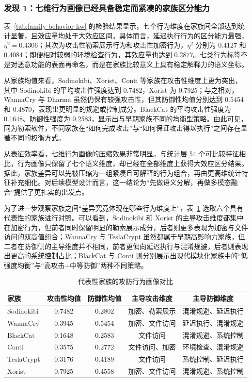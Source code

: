 \subsubsection{发现 1：七维行为画像已经具备稳定而紧凑的家族区分能力}

表~\ref{tab:family-behavior-kw} 的检验结果显示，七个行为维度在家族间全部达到统计显著，且效应量均处于大效应区间。具体而言，延迟执行行为的区分能力最强，$\eta^2=0.4306$；其次为攻击性勒索展示行为和攻击性加密行为，$\eta^2$ 分别为 0.4127 和 0.4084；即便相对较弱的环境检查行为，其效应量也达到 0.2877。七类行为标签不是对恶意功能的表面再命名，而是在家族比较意义上具有稳定解释力的语义坐标。

从家族均值来看，Sodinokibi、Xorist、Conti 等家族在攻击性维度上更为突出，其中 Sodinokibi 的平均攻击性强度达到 0.7482，Xorist 为 0.7925；与之相对，WannaCry 与 Dharma 虽然仍保有较强攻击性，但其防御性均值分别达到 0.5454 和 0.4870，表现出更明显的规避或控制成分。BlackCat 的平均攻击性强度为 0.1648、防御性强度为 0.2583，显示出与早期家族不同的均衡型策略。由此可见，同为勒索软件，不同家族在“如何完成攻击”与“如何保证攻击得以执行”之间存在显著不同的权衡方式。

从表征效率看，七维行为画像的压缩效果非常明显。与统计层 54 个可比较特征相比，行为画像只保留了七个语义维度，却已经在全部维度上获得大效应区分结果。据此，家族差异可以先被压缩为一组紧凑且可解释的行为组合，再由更高维统计特征补充细化。对后续模型设计而言，这一结论为“先做语义分解，再做多模态融合”提供了更扎实的出发点。

为了进一步观察家族之间“差异究竟体现在哪些行为维度上”，表~\ref{tab:representative-family-profiles} 选取六个具有代表性的家族进行对照。可以看到，Sodinokibi 和 Xorist 的主导攻击维度都集中在加密行为，但前者同时保留明显的勒索展示成分，后者则更多表现为加密与文件访问的双高值组合；WannaCry 与 TeslaCrypt 虽然都属于早期高影响力家族，但二者在防御侧的主导维度并不相同，前者更偏向延迟执行与混淆规避，后者则表现出更高的系统控制占比；BlackCat 与 Conti 则分别展示出现代模块化家族中的“低强度均衡”与“高攻击+中等防御”两种不同策略。

\begin{table}[htbp]
\centering
\footnotesize
\setlength{\tabcolsep}{3.5pt}
\caption{代表性家族的攻防行为画像对比}
\label{tab:representative-family-profiles}
\begin{tabular}{lcccc}
\toprule
家族 & 攻击性均值 & 防御性均值 & 主导攻击维度 & 主导防御维度 \\
\midrule
Sodinokibi & 0.7482 & 0.2802 & 加密、勒索展示 & 混淆规避、延迟执行 \\
WannaCry & 0.3945 & 0.5454 & 加密、文件访问 & 延迟执行、混淆规避 \\
BlackCat & 0.1648 & 0.2583 & 文件访问 & 混淆规避、系统控制 \\
Conti & 0.3575 & 0.2772 & 文件访问、加密 & 环境检查、混淆规避 \\
TeslaCrypt & 0.3176 & 0.4189 & 文件访问 & 系统控制、延迟执行 \\
Xorist & 0.7925 & 0.4558 & 加密、文件访问 & 混淆规避、系统控制 \\
\bottomrule
\end{tabular}
\end{table}

